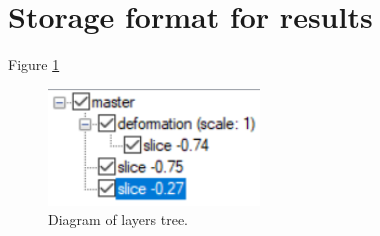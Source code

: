 \section{Storage format for results}
\label{sec:storage-format}





Figure \ref{fig:layers-tree}

\begin{figure}[H]
    \centering
    \includegraphics[width=0.5\textwidth]{figures/layers-tree-diagram}
    \decoRule
    \caption{Diagram of layers tree.}
    \label{fig:layers-tree}
\end{figure}




